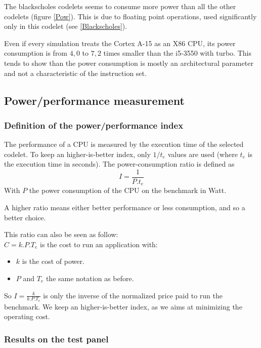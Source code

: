 \documentclass{article}
\begin{document}
\begin{multicols}{2}
The blackscholes codelets seems to consume more power than all the other codelets (figure \ref{Pow}). This is due to floating point operations, used significantly only in this codelet (see \ref{Blackscholes}).

Even if every simulation treats the Cortex A-15 as an X86 CPU, its power consumption is from $4,0$ to $7,2$ times smaller than the i5-3550 with turbo. This tends to show than the power consumption is mostly an architectural parameter and not a characteristic of the instruction set.


\subsection{Power/performance measurement}
\subsubsection{Definition of the power/performance index}
The performance of a CPU is measured by the execution time of the selected codelet. To keep an higher-is-better index, only $1/t_e$ values are used (where $t_e$ is the execution time in seconds).
The power-consumption ratio is defined as 
\begin{equation}
I=\frac{1}{P.t_e}
\end{equation}
With $P$ the power consumption of the CPU on the benchmark in Watt.

A higher ratio means either better performance or less consumption, and so a better choice.

\bigskip

This ratio can also be seen as follow:\\
$C=k.P.T_e$ is the cost to run an application with:
\begin{itemize}
\item $k$ is the cost of power.
\item $P$ and $T_e$ the same notation as before.
\end{itemize}


So $I=\frac{k}{k.P.T_e}$ is only the inverse of the normalized price paid to run the benchmark. We keep an higher-is-better index, as we aims at minimizing the operating cost.




\subsubsection{Results on the test panel}



\end{multicols}
\end{document}

